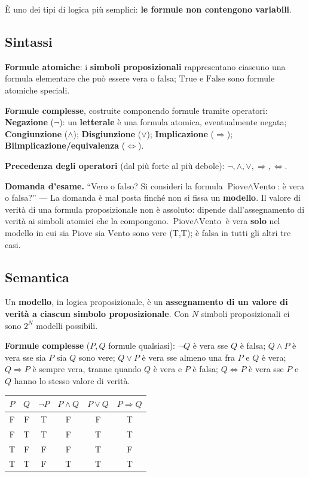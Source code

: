 \documentclass[11pt,a4paper]{report}
\newcommand{\domandaesame}[1]{\begin{esame}\textbf{Domanda d'esame.} #1\end{esame}}
\begin{document}
È uno dei tipi di logica più semplici: \textbf{le formule non contengono variabili}.

\subsection*{Sintassi}

\textbf{Formule atomiche}: i \textbf{simboli proposizionali} rappresentano ciascuno una formula elementare che può essere vera o falsa; $\text{True}$ e $\text{False}$ sono formule atomiche speciali.

\textbf{Formule complesse}, costruite componendo formule tramite operatori: \textbf{Negazione} ($\neg$): un \textbf{letterale} è una formula atomica, eventualmente negata; \textbf{Congiunzione} ($\wedge$); \textbf{Disgiunzione} ($\vee$); \textbf{Implicazione} ($\Rightarrow$); \textbf{Biimplicazione/equivalenza} ($\Leftrightarrow$).

\textbf{Precedenza degli operatori} (dal più forte al più debole): $\neg, \wedge, \vee, \Rightarrow, \Leftrightarrow$.

\domandaesame{``Vero o falso? Si consideri la formula $\text{Piove}\wedge\text{Vento}$: è vera o falsa?'' --- La domanda è mal posta finché non si fissa un \textbf{modello}. Il valore di verità di una formula proposizionale non è assoluto: dipende dall'assegnamento di verità ai simboli atomici che la compongono. $\text{Piove}\wedge\text{Vento}$ è vera \textbf{solo} nel modello in cui sia $\text{Piove}$ sia $\text{Vento}$ sono vere (T,T); è falsa in tutti gli altri tre casi.}

\subsection*{Semantica}

Un \textbf{modello}, in logica proposizionale, è un \textbf{assegnamento di un valore di verità a ciascun simbolo proposizionale}. Con $N$ simboli proposizionali ci sono $2^N$ modelli possibili.

\textbf{Formule complesse} ($P,Q$ formule qualsiasi): $\neg Q$ è vera sse $Q$ è falsa; $Q\wedge P$ è vera sse sia $P$ sia $Q$ sono vere; $Q\vee P$ è vera sse almeno una fra $P$ e $Q$ è vera; $Q\Rightarrow P$ è sempre vera, tranne quando $Q$ è vera e $P$ è falsa; $Q\Leftrightarrow P$ è vera sse $P$ e $Q$ hanno lo stesso valore di verità.

\begin{center}
\begin{tabular}{@{}cccccc@{}}
\toprule
$P$ & $Q$ & $\neg P$ & $P\wedge Q$ & $P\vee Q$ & $P\Rightarrow Q$ \\
\midrule
F & F & T & F & F & T \\
F & T & T & F & T & T \\
T & F & F & F & T & F \\
T & T & F & T & T & T \\
\bottomrule
\end{tabular}
\end{center}
\end{document}
